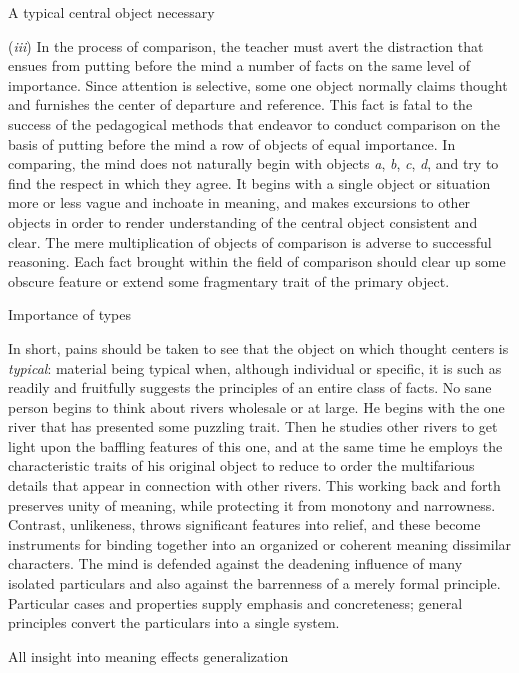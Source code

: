 \documentclass[letterpaper]{book}
\begin{document}
A typical central object necessary

(\emph{iii}) In the process of comparison, the teacher must avert the
distraction that ensues from putting before the mind a number of facts
on the same level of importance. Since attention is selective, some one
object normally claims thought and furnishes the center of departure and
reference. This fact is fatal to the success of the pedagogical methods
that endeavor to conduct comparison on the basis of putting before the
mind a row of objects of equal importance. In comparing, the mind does
not naturally begin with objects \emph{a}, \emph{b}, \emph{c}, \emph{d},
and try to find the respect in which they agree. It begins with a single
object or situation more or less vague and inchoate in meaning, and
makes excursions to other objects in order to render understanding of
the central object consistent and clear. The mere multiplication of
objects of comparison is adverse to successful reasoning. Each fact
brought within the field of comparison should clear up some obscure
feature or extend some fragmentary trait of the primary object.

Importance of types

In short, pains should be taken to see that the object on which thought
centers is \emph{typical}: material being typical when, although
individual or specific, it is such as readily and fruitfully suggests
the principles of an
entire
class of facts. No sane person begins to think about rivers wholesale or
at large. He begins with the one river that has presented some puzzling
trait. Then he studies other rivers to get light upon the baffling
features of this one, and at the same time he employs the characteristic
traits of his original object to reduce to order the multifarious
details that appear in connection with other rivers. This working back
and forth preserves unity of meaning, while protecting it from monotony
and narrowness. Contrast, unlikeness, throws significant features into
relief, and these become instruments for binding together into an
organized or coherent meaning dissimilar characters. The mind is
defended against the deadening influence of many isolated particulars
and also against the barrenness of a merely formal principle. Particular
cases and properties supply emphasis and concreteness; general
principles convert the particulars into a single system.

All insight into meaning effects generalization
\end{document}
